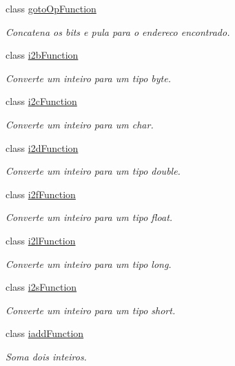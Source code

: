\begin{DoxyCompactItemize}
class \hyperlink{classInstruction_1_1gotoOpFunction}{goto\+Op\+Function}
\begin{DoxyCompactList}\small\item\em Concatena os bits e pula para o endereco encontrado. \end{DoxyCompactList}\item 
class \hyperlink{classInstruction_1_1i2bFunction}{i2b\+Function}
\begin{DoxyCompactList}\small\item\em Converte um inteiro para um tipo byte. \end{DoxyCompactList}\item 
class \hyperlink{classInstruction_1_1i2cFunction}{i2c\+Function}
\begin{DoxyCompactList}\small\item\em Converte um inteiro para um char. \end{DoxyCompactList}\item 
class \hyperlink{classInstruction_1_1i2dFunction}{i2d\+Function}
\begin{DoxyCompactList}\small\item\em Converte um inteiro para um tipo double. \end{DoxyCompactList}\item 
class \hyperlink{classInstruction_1_1i2fFunction}{i2f\+Function}
\begin{DoxyCompactList}\small\item\em Converte um inteiro para um tipo float. \end{DoxyCompactList}\item 
class \hyperlink{classInstruction_1_1i2lFunction}{i2l\+Function}
\begin{DoxyCompactList}\small\item\em Converte um inteiro para um tipo long. \end{DoxyCompactList}\item 
class \hyperlink{classInstruction_1_1i2sFunction}{i2s\+Function}
\begin{DoxyCompactList}\small\item\em Converte um inteiro para um tipo short. \end{DoxyCompactList}\item 
class \hyperlink{classInstruction_1_1iaddFunction}{iadd\+Function}
\begin{DoxyCompactList}\small\item\em Soma dois inteiros. \end{DoxyCompactList}\item 

\end{DoxyCompactItemize}
